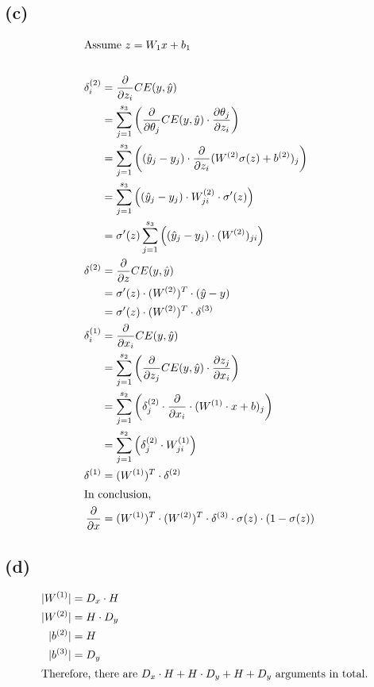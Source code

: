 \documentclass {article}
\begin{document}
	\subsection*{(c)}
	\begin{align*}
		\intertext{Assume $z = W_1 x + b_1$} \\
		\delta^{(2)}_i &= \frac{\partial }{\partial z_i} CE(y, \hat{y}) 
		\\&= \sum_{j=1}^{s_3}\left(\frac{\partial}{\partial \theta_j} CE(y, \hat{y}) \cdot \frac{\partial \theta_j}{\partial z_i} \right)\\
		&= \sum_{j=1}^{s_3}\left((\hat{y}_j - y_j) \cdot \frac{\partial }{\partial z_i} (W^{(2)}\sigma(z)+b^{(2)})_j \right)\\
		&= \sum_{j=1}^{s_3} \left((\hat{y}_j - y_j) \cdot W^{(2)}_{ji} \cdot \sigma'(z)\right) \\
		&= \sigma'(z) \sum_{j=1}^{s_3} \left((\hat{y}_j - y_j) \cdot (W^{(2)})_{ji} \right) \\
		\delta^{(2)} &= \frac{\partial }{\partial z} CE(y, \hat{y}) \\
		&= \sigma'(z) \cdot (W^{(2)})^T \cdot (\hat{y} - y)\\
		&= \sigma'(z) \cdot (W^{(2)})^T \cdot \delta^{(3)}\\
		\delta^{(1)}_i &= \frac{\partial}{\partial x_i} CE(y, \hat{y}) \\
		&= \sum_{j=1}^{s_2} \left(\frac{\partial}{\partial z_j} CE(y, \hat{y}) \cdot \frac{\partial z_j}{\partial x_i} \right) \\
		&= \sum_{j=1}^{s_2} \left( \delta^{(2)}_j \cdot \frac{\partial}{\partial x_i} \cdot (W^{(1)} \cdot x + b)_j \right) \\
		&= \sum_{j=1}^{s_2} \left( \delta^{(2)}_j \cdot W^{(1)}_{ji}\right) \\
		\delta^{(1)} &= (W^{(1)})^T \cdot \delta^{(2)} \\
		\intertext{In conclusion,}
		\frac{\partial}{\partial x} &= (W^{(1)})^T \cdot (W^{(2)})^T \cdot \delta^{(3)} \cdot \sigma(z) \cdot (1 - \sigma(z))
	\end{align*}
	\subsection*{(d)}
	\begin{align*}
		|W^{(1)}| &= D_x \cdot H \\
		|W^{(2)}| &= H \cdot D_y \\
		|b^{(2)}| &= H \\
		|b^{(3)}| &= D_y \\
		\intertext{Therefore,
		there are $D_x \cdot H + H \cdot D_y + H + D_y$ arguments in total.}
	\end{align*}
\end{document}
